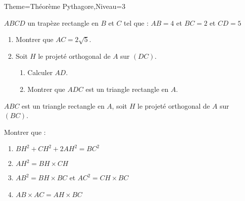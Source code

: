 \documentclass[a4paper,12pt]{article}
\begin{document}
\begin{Maquette}[Fiche]{Theme=Théorème Pythagore,Niveau=3}
\begin{exercice}
\begin{minipage}{.75\linewidth}
$ABCD$ un trapèze rectangle en $B$ et $C$ tel que : $AB=4$ et $BC=2$ et $CD=5$
\begin{enumerate}
\item Montrer que $AC=2\sqrt{5}$.
\item Soit $H$ le projeté orthogonal de $A$ sur $(DC)$.
\begin{enumerate}
\item Calculer $AD$.
\item Montrer que $ADC$ est un triangle rectangle en $A$.
\end{enumerate}
\end{enumerate}
\end{minipage}%
\begin{minipage}{.25\linewidth}
\end{minipage}
\end{exercice}

\begin{exercice}
$ABC$ est un triangle rectangle en $A$, soit $H$ le projeté orthogonal de $A$ sur $(BC)$.

Montrer que :
\begin{enumerate}
\item $BH^{2}+CH^{2}+2AH^{2}=BC^{2}$
\item $AH^{2}=BH\times CH$
\item $AB^{2}=BH\times BC$ et $AC^{2}=CH\times BC$
\item $AB\times AC=AH\times BC$
\end{enumerate}
\end{exercice}



\end{Maquette}
\end{document}
